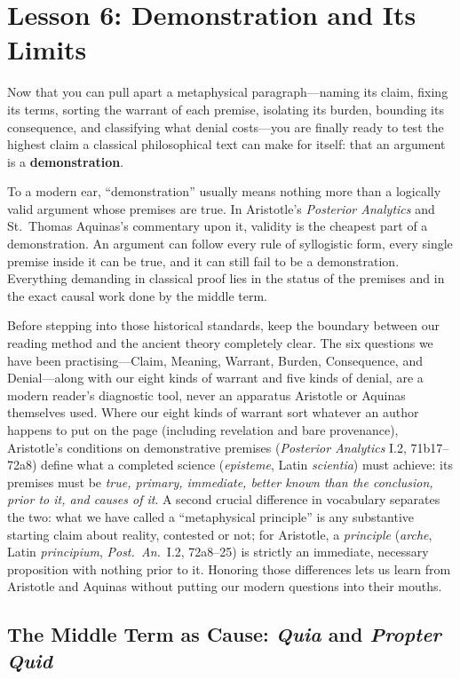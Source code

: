 \section{Lesson 6: Demonstration and Its Limits}

Now that you can pull apart a metaphysical paragraph---naming its claim, fixing its terms, sorting the warrant of each premise, isolating its burden, bounding its consequence, and classifying what denial costs---you are finally ready to test the highest claim a classical philosophical text can make for itself: that an argument is a \textbf{demonstration}.

To a modern ear, ``demonstration'' usually means nothing more than a logically valid argument whose premises are true. In Aristotle's \emph{Posterior Analytics} and St.\ Thomas Aquinas's commentary upon it, validity is the cheapest part of a demonstration. An argument can follow every rule of syllogistic form, every single premise inside it can be true, and it can still fail to be a demonstration. Everything demanding in classical proof lies in the status of the premises and in the exact causal work done by the middle term.

Before stepping into those historical standards, keep the boundary between our reading method and the ancient theory completely clear. The six questions we have been practising---Claim, Meaning, Warrant, Burden, Consequence, and Denial---along with our eight kinds of warrant and five kinds of denial, are a modern reader's diagnostic tool, never an apparatus Aristotle or Aquinas themselves used. Where our eight kinds of warrant sort whatever an author happens to put on the page (including revelation and bare provenance), Aristotle's conditions on demonstrative premises (\emph{Posterior Analytics} I.2, 71b17--72a8) define what a completed science (\emph{episteme}, Latin \emph{scientia}) must achieve: its premises must be \emph{true, primary, immediate, better known than the conclusion, prior to it, and causes of it}. A second crucial difference in vocabulary separates the two: what we have called a ``metaphysical principle'' is any substantive starting claim about reality, contested or not; for Aristotle, a \emph{principle} (\emph{arche}, Latin \emph{principium}, \emph{Post.\ An.}\ I.2, 72a8--25) is strictly an immediate, necessary proposition with nothing prior to it. Honoring those differences lets us learn from Aristotle and Aquinas without putting our modern questions into their mouths.

\subsection{The Middle Term as Cause: \emph{Quia} and \emph{Propter Quid}}

